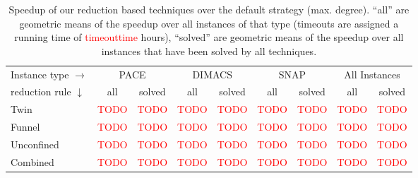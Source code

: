 \documentclass[a4paper,UKenglish,cleveref, autoref, thm-restate]{lipics-v2021}
\begin{document}
\begin{table}[t]
  \caption{Speedup of our reduction based techniques over the default
    strategy (max. degree). ``all'' are geometric means of the speedup over all
  instances of that type (timeouts are assigned a running time of
  \textcolor{red}{timeouttime} hours), ``solved'' are geometric means of the
  speedup over all instances that have been solved by all techniques.}
\label{tab:summary_reduction}

  \centering
  \begin{tabular}{|l|rr|rr|rr|rr|}
    \hline
    Instance type $\rightarrow$ & \multicolumn{2}{c|}{PACE} & \multicolumn{2}{c|}{DIMACS} & \multicolumn{2}{c|}{SNAP} & \multicolumn{2}{c|}{All Instances}                                                                                                          \\
    reduction rule $\downarrow$ & \multicolumn{1}{c}{all}   & \multicolumn{1}{c|}{solved} & \multicolumn{1}{c}{all}   & \multicolumn{1}{c|}{solved} & \multicolumn{1}{c}{all} & \multicolumn{1}{c|}{solved} & \multicolumn{1}{c}{all} & \multicolumn{1}{c|}{solved} \\
    \hline
    Twin                        & \textcolor{red}{TODO}     & \textcolor{red}{TODO}       & \textcolor{red}{TODO}     & \textcolor{red}{TODO}       & \textcolor{red}{TODO}   & \textcolor{red}{TODO}       & \textcolor{red}{TODO}   & \textcolor{red}{TODO}       \\
    Funnel                      & \textcolor{red}{TODO}     & \textcolor{red}{TODO}       & \textcolor{red}{TODO}     & \textcolor{red}{TODO}       & \textcolor{red}{TODO}   & \textcolor{red}{TODO}       & \textcolor{red}{TODO}   & \textcolor{red}{TODO}       \\
    Unconfined                  & \textcolor{red}{TODO}     & \textcolor{red}{TODO}       & \textcolor{red}{TODO}     & \textcolor{red}{TODO}       & \textcolor{red}{TODO}   & \textcolor{red}{TODO}       & \textcolor{red}{TODO}   & \textcolor{red}{TODO}       \\
    Combined                    & \textcolor{red}{TODO}     & \textcolor{red}{TODO}       & \textcolor{red}{TODO}     & \textcolor{red}{TODO}       & \textcolor{red}{TODO}   & \textcolor{red}{TODO}       & \textcolor{red}{TODO}   & \textcolor{red}{TODO}       \\
    \hline
    \end{tabular}
\end{table}
\end{document}
